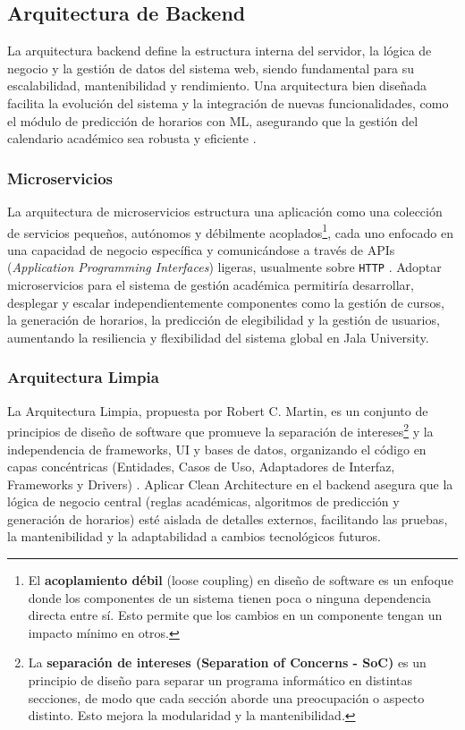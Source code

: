 \subsection{Arquitectura de Backend}
La arquitectura backend define la estructura interna del servidor, la lógica de negocio y la gestión de datos del sistema web, siendo fundamental para su escalabilidad, mantenibilidad y rendimiento.
Una arquitectura bien diseñada facilita la evolución del sistema y la integración de nuevas funcionalidades, como el módulo de predicción de horarios con ML, asegurando que la gestión del calendario académico sea robusta y eficiente \parencite{Richards2015}.

\subsubsection{Microservicios}
La arquitectura de microservicios estructura una aplicación como una colección de servicios pequeños, autónomos y débilmente acoplados\footnote{El \textbf{acoplamiento débil} (loose coupling) en diseño de software es un enfoque donde los componentes de un sistema tienen poca o ninguna dependencia directa entre sí.
Esto permite que los cambios en un componente tengan un impacto mínimo en otros.}, cada uno enfocado en una capacidad de negocio específica y comunicándose a través de APIs (\textit{Application Programming Interfaces}) ligeras, usualmente sobre \texttt{HTTP} \parencite{Newman2015}.
Adoptar microservicios para el sistema de gestión académica permitiría desarrollar, desplegar y escalar independientemente componentes como la gestión de cursos, la generación de horarios, la predicción de elegibilidad y la gestión de usuarios, aumentando la resiliencia y flexibilidad del sistema global en Jala University.

\subsubsection{Arquitectura Limpia}
La Arquitectura Limpia, propuesta por Robert C.
Martin, es un conjunto de principios de diseño de software que promueve la separación de intereses\footnote{La \textbf{separación de intereses (Separation of Concerns - SoC)} es un principio de diseño para separar un programa informático en distintas secciones, de modo que cada sección aborde una preocupación o aspecto distinto.
Esto mejora la modularidad y la mantenibilidad.} y la independencia de frameworks, UI y bases de datos, organizando el código en capas concéntricas (Entidades, Casos de Uso, Adaptadores de Interfaz, Frameworks y Drivers) \parencite{Martin2017}.
Aplicar Clean Architecture en el backend asegura que la lógica de negocio central (reglas académicas, algoritmos de predicción y generación de horarios) esté aislada de detalles externos, facilitando las pruebas, la mantenibilidad y la adaptabilidad a cambios tecnológicos futuros.

